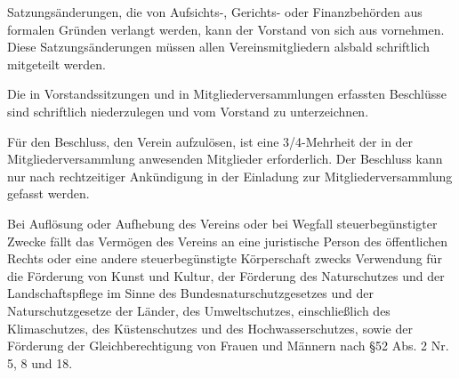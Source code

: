 \begin{contract}
    Satzungsänderungen, die von Aufsichts-, Gerichts- oder Finanzbehörden aus formalen Gründen verlangt werden, kann der Vorstand von sich aus vornehmen. Diese Satzungsänderungen müssen allen Vereinsmitgliedern alsbald schriftlich mitgeteilt werden.

    Die in Vorstandssitzungen und in Mitgliederversammlungen erfassten Beschlüsse sind schriftlich niederzulegen und vom Vorstand zu unterzeichnen.

    Für den Beschluss, den Verein aufzulösen, ist eine 3/4-Mehrheit der in der Mitgliederversammlung anwesenden Mitglieder erforderlich. Der Beschluss kann nur nach rechtzeitiger Ankündigung in der Einladung zur Mitgliederversammlung gefasst werden.

    Bei Auflösung oder Aufhebung des Vereins oder bei Wegfall steuerbegünstigter Zwecke fällt das Vermögen des Vereins an eine juristische Person des öffentlichen Rechts oder eine andere steuerbegünstigte Körperschaft zwecks Verwendung für die Förderung von Kunst und Kultur, der Förderung des Naturschutzes und der Landschaftspflege im Sinne des Bundesnaturschutzgesetzes und der Naturschutzgesetze der Länder, des Umweltschutzes, einschließlich des Klimaschutzes, des Küstenschutzes und des Hochwasserschutzes, sowie der Förderung der Gleichberechtigung von Frauen und Männern nach \S 52 Abs. 2 Nr. 5, 8 und 18.

\end{contract}

